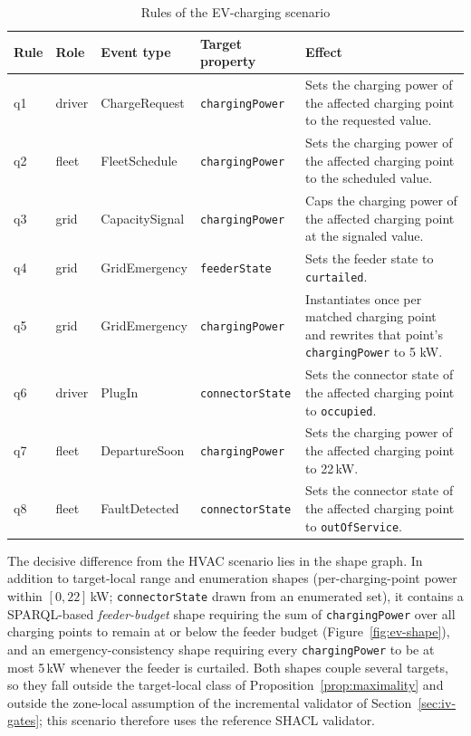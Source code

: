 \documentclass{ieeeaccess}
\theoremstyle{definition}
\theoremstyle{plain}
\theoremstyle{remark}
\begin{document}
\begin{table}[h]
\caption{Rules of the EV-charging scenario}
\label{tab:ev-rules}
\centering
\begin{tabular}{|p{1.0cm}|p{1.4cm}|p{2.6cm}|p{2.6cm}|p{6.2cm}|}
\hline
\textbf{Rule} & \textbf{Role} & \textbf{Event type} & \textbf{Target property} & \textbf{Effect} \\
\hline
q1 & driver & ChargeRequest & \texttt{chargingPower} & Sets the charging power of the affected charging point to the requested value. \\
\hline
q2 & fleet & FleetSchedule & \texttt{chargingPower} & Sets the charging power of the affected charging point to the scheduled value. \\
\hline
q3 & grid & CapacitySignal & \texttt{chargingPower} & Caps the charging power of the affected charging point at the signaled value. \\
\hline
q4 & grid & GridEmergency & \texttt{feederState} & Sets the feeder state to \texttt{curtailed}. \\
\hline
q5 & grid & GridEmergency & \texttt{chargingPower} & Instantiates once per matched charging point and rewrites that point's \texttt{chargingPower} to 5 kW. \\
\hline
q6 & driver & PlugIn & \texttt{connectorState} & Sets the connector state of the affected charging point to \texttt{occupied}. \\
\hline
q7 & fleet & DepartureSoon & \texttt{chargingPower} & Sets the charging power of the affected charging point to 22\,kW. \\
\hline
q8 & fleet & FaultDetected & \texttt{connectorState} & Sets the connector state of the affected charging point to \texttt{outOfService}. \\
\hline
\end{tabular}
\end{table}

The decisive difference from the HVAC scenario lies in the shape graph. In addition to target-local range and enumeration shapes (per-charging-point power within $[0, 22]$\,kW; \texttt{connectorState} drawn from an enumerated set), it contains a SPARQL-based \emph{feeder-budget} shape requiring the sum of \texttt{chargingPower} over all charging points to remain at or below the feeder budget (Figure~\ref{fig:ev-shape}), and an emergency-consistency shape requiring every \texttt{chargingPower} to be at most 5\,kW whenever the feeder is curtailed. Both shapes couple several targets, so they fall outside the target-local class of Proposition~\ref{prop:maximality} and outside the zone-local assumption of the incremental validator of Section~\ref{sec:iv-gates}; this scenario therefore uses the reference SHACL validator.
\end{document}
